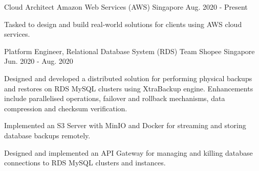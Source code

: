 

\begin{cventries}

  \cventry
    {Cloud Architect} %
    {Amazon Web Services (AWS)} %
    {Singapore} %
    {Aug. 2020 - Present} %
    {
      \begin{cvitems} %
        \item {Tasked to design and build real-world solutions for clients using AWS cloud services.}
      \end{cvitems}
    }

  \cventry
    {Platform Engineer, Relational Database System (RDS) Team} %
    {Shopee} %
    {Singapore} %
    {Jun. 2020 - Aug. 2020} %
    {
      \begin{cvitems} %
        \item {Designed and developed a distributed solution for performing physical backups and restores on RDS MySQL clusters using XtraBackup engine.
        Enhancements include parallelised operations, failover and rollback mechanisms, data compression and checksum verification.}
        \item {Implemented an S3 Server with MinIO and Docker for streaming and storing database backups remotely.}
        \item {Designed and implemented an API Gateway for managing and killing database connections to RDS MySQL clusters and instances.}
      \end{cvitems}
    }


\end{cventries}
